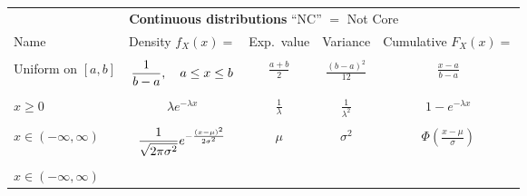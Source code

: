 \begin{table}[h!] 
\centering  
\begin{tabular}{|lcccc|}   \hline 
 \multicolumn{5}{|c|}{\textbf{Continuous distributions} \qquad ``NC'' $=$ Not Core} \\[1ex] 
Name & \begin{minipage}{0.25\textwidth}Density $f_X(x)=$\end{minipage}  & Exp.\ value & Variance & Cumulative $F_X(x)=$  \\[2ex]
\hline   \hline &&&& \\[0ex]
\begin{minipage}{0.20\textwidth} \raggedright
Uniform on $[a,b]$
\end{minipage}    & 
\begin{minipage}{0.32\textwidth} \raggedright 
$\displaystyle \displaystyle \frac1{b-a}, \quad a \leq x \leq b$
  \end{minipage}  & 
     $\displaystyle \frac{a+b}2$   & $\displaystyle \frac{(b-a)^2}{12}$ 
     & $\displaystyle \frac{x-a}{b-a}$  \\[3.5ex]
\begin{minipage}{0.20\textwidth} \raggedright 
$\text{Exponential}(\lambda)$\\
$x \geq 0$
\end{minipage}   &  
\begin{minipage}{0.32\textwidth} \raggedright
$\displaystyle \lambda e^{-\lambda x}$\end{minipage}  
&  $\displaystyle \frac1\lambda$ & $\displaystyle \frac1{\lambda^2}$ & $\displaystyle 1-e^{-\lambda x}$    \\[3.5ex]
\begin{minipage}{0.20\textwidth} \raggedright 
$\text{Normal}(\mu,\sigma^2)$\\
$x \in (-\infty, \infty)$ 
\end{minipage}   &  
\begin{minipage}{0.32\textwidth} \raggedright
$\displaystyle \displaystyle \frac1{\sqrt{2\pi \sigma^2}} e^{-\frac{(x-\mu)^2}{2\sigma^2}}$ \end{minipage}  
&  $\mu$ & $\sigma^2$ & $\displaystyle \Phi\left(\frac{x-\mu}{\sigma}\right)$
\\[3.5ex]
\begin{minipage}{0.20\textwidth} \raggedright 
$\text{Standard normal}$\\
$x \in (-\infty, \infty)$ 
\end{minipage}   &  
\begin{minipage}{0.32\textwidth} \raggedright

\end{minipage}
\end{tabular}
\end{table}
